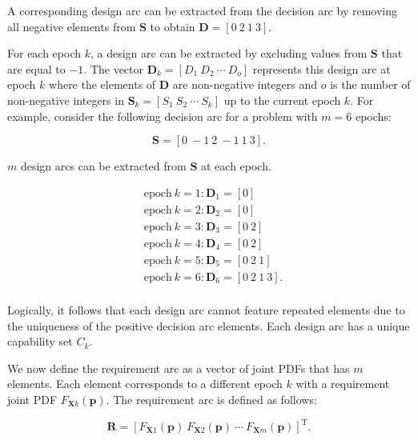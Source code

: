 A corresponding design arc can be extracted from the decision arc by removing all negative elements from $\mathbf{S}$ to obtain $\mathbf{D} = \left[0 ~ 2 ~ 1 ~ 3\right]$. 

For each epoch $k$, a design arc can be extracted by excluding values from $\mathbf{S}$ that are equal to $-1$. The vector $\mathbf{D}_k = \left[D_1 ~ D_2 ~ \cdots ~ D_o\right]$ represents this design arc at epoch $k$ where the elements of $\mathbf{D}$ are non-negative integers and $o$ is the number of non-negative integers in $\mathbf{S}_k = \left[S_1 ~ S_2 ~ \cdots ~ S_k\right]$ up to the current epoch $k$. For example, consider the following decision arc for a problem with $m=6$ epochs:

\begin{equation*} \label{eq:decisionarcex}
	\mathbf{S} = \left[0 ~ -1 ~ 2 ~ -1 ~ 1 ~ 3\right].
\end{equation*}

$m$ design arcs can be extracted from $\mathbf{S}$ at each epoch.

\begin{equation*}
	\begin{aligned}
		& \mathrm{epoch~} k=1: \mathbf{D}_1 = \left[0\right]\\
		& \mathrm{epoch~} k=2: \mathbf{D}_2 = \left[0\right]\\
		& \mathrm{epoch~} k=3: \mathbf{D}_3 = \left[0 ~ 2\right]\\
		& \mathrm{epoch~} k=4: \mathbf{D}_4 = \left[0 ~ 2\right]\\
		& \mathrm{epoch~} k=5: \mathbf{D}_5 = \left[0 ~ 2 ~ 1\right]\\
		& \mathrm{epoch~} k=6: \mathbf{D}_6 = \left[0 ~ 2 ~ 1 ~ 3\right].\\
	\end{aligned}
\end{equation*}

Logically, it follows that each design arc cannot feature repeated elements due to the uniqueness of the positive decision arc elements. Each design arc has a unique capability set $C_k$.

We now define the requirement arc as a vector of joint \acp{PDF} that has $m$ elements. Each element corresponds to a different epoch $k$ with a requirement joint \ac{PDF} $F_{\mathbf{X}k}(\mathbf{p})$. The requirement arc is defined as follows:

\begin{equation} \label{eq:requirementarc}
	\mathbf{R} = \left[F_{\mathbf{X}1}(\mathbf{p}) ~ F_{\mathbf{X}2}(\mathbf{p}) ~ \cdots ~ F_{\mathbf{X}m}(\mathbf{p})\right]^{\mathrm{T}}.
\end{equation}

